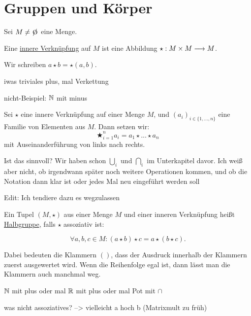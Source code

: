 \section{Gruppen und Körper}

\begin{definition}
    Sei $M \neq \e$ eine Menge.

    Eine \underline{innere Verknüpfung} auf $M$ ist eine Abbildung $\star: M \times M \longrightarrow M$.

    Wir schreiben $a \star b = \star(a, b)$.
\end{definition}

\begin{example}
    iwas triviales
    plus, mal
    Verkettung

    nicht-Beispiel: $\mathbb{N}$ mit minus
\end{example}

\begin{definition}
    Sei $\star$ eine innere Verknüpfung auf einer Menge $M$, und $(a_i)_{i \in \{1, ..., n\}}$ eine Familie von Elementen aus $M$. Dann setzen wir:
    $$\bigstar_{i = 1}^n a_i = a_1 \star ... \star a_n$$
    mit Auseinanderführung von links nach rechts.
\end{definition}

\begin{query}
    Ist das sinnvoll? Wir haben schon $\bigcup_i$ und $\bigcap_i$ im Unterkapitel davor. Ich weiß aber nicht, ob irgendwann später noch weitere Operationen kommen, und ob die Notation dann klar ist oder jedes Mal neu eingeführt werden soll

    Edit: Ich tendiere dazu es wegzulassen
\end{query}

\begin{definition}[Halbgruppe]
    Ein Tupel $(M, \star)$ aus einer Menge $M$ und einer inneren Verknüpfung heißt \underline{Halbgruppe}, falls $\star$ assoziativ ist:

    $$\forall a, b, c \in M: (a \star b) \star c = a \star (b \star c).$$

    Dabei bedeuten die Klammern $()$, dass der Ausdruck innerhalb der Klammern zuerst ausgewertet wird. Wenn die Reihenfolge egal ist, dann lässt man die Klammern auch manchmal weg.
\end{definition}

\begin{example}
    $\mathbb{N}$ mit plus oder mal
    $\mathbb{R}$ mit plus oder mal
    Pot mit $\cap$
    
    was nicht assoziatives? --> vielleicht a hoch b (Matrixmult zu früh)
\end{example}

